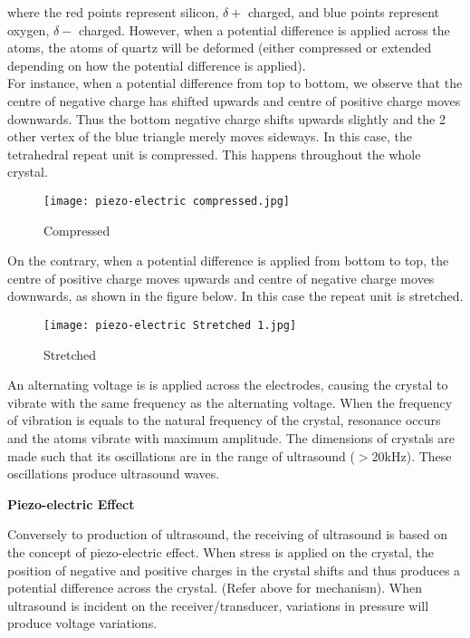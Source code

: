 \documentclass{article}
\begin{document}
where the red points represent silicon, $\delta +$ charged, and blue points represent oxygen, $\delta -$ charged. However, when a potential difference is applied across the atoms, the atoms of quartz will be deformed (either compressed or extended depending on how the potential difference is applied). 
\\For instance, when a potential difference from top to bottom, we observe that the centre of negative charge has shifted upwards and centre of positive charge moves downwards. Thus the bottom negative charge shifts upwards slightly and the 2 other vertex of the blue triangle merely moves sideways. In this case, the tetrahedral repeat unit is compressed. This happens throughout the whole crystal. 

\begin{figure}[H]
    \centering
    \texttt{[image: piezo-electric compressed.jpg]}
    \caption*{Compressed}
    \label{fig:my_label}
\end{figure}

On the contrary, when a potential difference is applied from bottom to top, the centre of positive charge moves upwards and centre of negative charge moves downwards, as shown in the figure below. In this case the repeat unit is stretched. 

\begin{figure}[H]
    \centering
    \texttt{[image: piezo-electric Stretched 1.jpg]}
    \caption*{Stretched}
    \label{fig:my_label}
\end{figure}

An alternating voltage is is applied across the electrodes, causing the crystal to vibrate with the same frequency as the alternating voltage. When the frequency of vibration is equals to the natural frequency of the crystal, resonance occurs and the atoms vibrate with maximum amplitude. The dimensions of crystals are made such that its oscillations are in the range of ultrasound ($>$20kHz). These oscillations produce ultrasound waves.

\begin{flushleft}
\textbf{Piezo-electric Effect}
\end{flushleft}

Conversely to production of ultrasound, the receiving of ultrasound is based on the concept of piezo-electric effect. When stress is applied on the crystal, the position of negative and positive charges in the crystal shifts and thus produces a potential difference across the crystal. (Refer above for mechanism). When ultrasound is incident on the receiver/transducer, variations in pressure will produce voltage variations.
\end{document}
